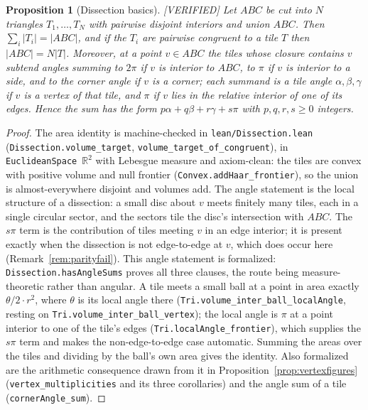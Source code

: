 \documentclass[11pt,reqno]{amsart}
\theoremstyle{plain}
\newtheorem{proposition}[theorem]{Proposition}
\theoremstyle{definition}
\newcommand{\R}{\mathbb{R}}
\newcommand{\lab}[1]{\hfill\textnormal{\footnotesize\textsc{[#1]}}}
\begin{document}
\begin{proposition}[Dissection basics]\label{prop:dissection}\lab{VERIFIED}
Let $ABC$ be cut into $N$ triangles $T_1,\dots,T_N$ with pairwise disjoint interiors and union $ABC$.
Then $\sum_i\lvert T_i\rvert=\lvert ABC\rvert$, and if the $T_i$ are pairwise congruent to a tile $T$
then $\lvert ABC\rvert=N\lvert T\rvert$. Moreover, at a point $v\in ABC$ the tiles whose closure
contains $v$ subtend angles summing to $2\pi$ if $v$ is interior to $ABC$, to $\pi$ if $v$ is interior
to a side, and to the corner angle if $v$ is a corner; each summand is a tile angle
$\alpha,\beta,\gamma$ if $v$ is a vertex of that tile, and $\pi$ if $v$ lies in the relative interior
of one of its edges. Hence the sum has the form $p\alpha+q\beta+r\gamma+s\pi$ with $p,q,r,s\ge0$
integers.
\end{proposition}

\begin{proof}
The area identity is machine-checked in \texttt{lean/Dissection.lean}
(\texttt{Dissection.volume\_target}, \texttt{volume\_target\_of\_congruent}), in
\texttt{EuclideanSpace}~$\R^2$ with Lebesgue measure and axiom-clean: the tiles are convex with
positive volume and null frontier (\texttt{Convex.addHaar\_frontier}), so the union is
almost-everywhere disjoint and volumes add. The angle statement is the local structure of a
dissection: a small disc about $v$ meets finitely many tiles, each in a single circular sector, and
the sectors tile the disc's intersection with $ABC$. The $s\pi$ term is the contribution of tiles
meeting $v$ in an edge interior; it is present exactly when the dissection is not edge-to-edge at
$v$, which does occur here (Remark~\ref{rem:parityfail}). This angle statement is formalized:
\texttt{Dissection.hasAngleSums} proves all three clauses, the route being measure-theoretic rather
than angular. A tile meets a small ball at a point in area exactly $\theta/2\cdot r^2$, where
$\theta$ is its local angle there (\texttt{Tri.volume\_inter\_ball\_localAngle}, resting on
\texttt{Tri.volume\_inter\_ball\_vertex}); the local angle is $\pi$ at a point interior to one of
the tile's edges (\texttt{Tri.localAngle\_frontier}), which supplies the $s\pi$ term and makes the
non-edge-to-edge case automatic. Summing the areas over the tiles and dividing by the ball's own
area gives the identity. Also formalized are the arithmetic consequence drawn from it in
Proposition~\ref{prop:vertexfigures} (\texttt{vertex\_multiplicities} and its three corollaries)
and the angle sum of a tile (\texttt{cornerAngle\_sum}).
\end{proof}
\end{document}
